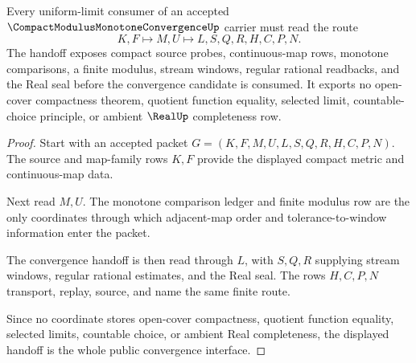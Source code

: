 \begin{theorem}
\label{thm:compact-modulus-monotone-convergence-handoff}
Every uniform-limit consumer of an accepted $\CompactModulusMonotoneConvergenceUp$ carrier must read the route
$$
K,F \longmapsto M,U \longmapsto L,S,Q,R,H,C,P,N .
$$
The handoff exposes compact source probes, continuous-map rows, monotone comparisons, a finite modulus, stream windows, regular rational readbacks, and the Real seal before the convergence candidate is consumed. It exports no open-cover compactness theorem, quotient function equality, selected limit, countable-choice principle, or ambient $\RealUp$ completeness row.
\end{theorem}
\begin{proof}
Start with an accepted packet $G=(K,F,M,U,L,S,Q,R,H,C,P,N)$. The source and map-family rows $K,F$ provide the displayed compact metric and continuous-map data.

Next read $M,U$. The monotone comparison ledger and finite modulus row are the only coordinates through which adjacent-map order and tolerance-to-window information enter the packet.

The convergence handoff is then read through $L$, with $S,Q,R$ supplying stream windows, regular rational estimates, and the Real seal. The rows $H,C,P,N$ transport, replay, source, and name the same finite route.

Since no coordinate stores open-cover compactness, quotient function equality, selected limits, countable choice, or ambient Real completeness, the displayed handoff is the whole public convergence interface.
\end{proof}


\begin{closurestatus}{\CompactModulusMonotoneConvergenceUp}
  \theoryclosure{\seedClosure}
  \formalstatus{\unformalizedV}
\end{closurestatus}
